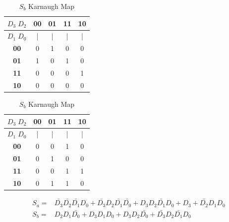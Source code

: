 \documentclass{article}
\begin{document}
\begin{table}[H]
  \centering
  \begin{minipage}{0.45\textwidth}
  \centering
  \begin{tabular}{|c|c|c|c|c|}
  \hline
  \textbf{$D_3 \; D_2$} & \textbf{00} & \textbf{01} & \textbf{11} & \textbf{10} \\
  \hline
  \textbf{$D_1 \; D_0$} & | & | & | & | \\
  \hline
  \textbf{00} & 0 & 1 & 0 & 0 \\
  \hline
  \textbf{01} & 1 & 0 & 1 & 0 \\
  \hline
  \textbf{11} & 0 & 0 & 0 & 1 \\
  \hline
  \textbf{10} & 0 & 0 & 0 & 0 \\
  \hline
  \end{tabular}
  \caption{$S_a$ Karnaugh Map}
  \end{minipage}
  \hfill
  \begin{minipage}{0.45\textwidth}
  \centering
  \begin{tabular}{|c|c|c|c|c|}
  \hline
  \textbf{$D_3 \; D_2$} & \textbf{00} & \textbf{01} & \textbf{11} & \textbf{10} \\
  \hline
  \textbf{$D_1 \; D_0$} & | & | & | & | \\
  \hline
  \textbf{00} & 0 & 0 & 1 & 0 \\
  \hline
  \textbf{01} & 0 & 1 & 0 & 0 \\
  \hline
  \textbf{11} & 0 & 0 & 1 & 1 \\
  \hline
  \textbf{10} & 0 & 1 & 1 & 0 \\
  \hline
  \end{tabular}
  \caption{$S_b$ Karnaugh Map}
  \end{minipage}
\end{table}
\begin{align*}
  S_a =& \bar{D_3}\bar{D_2}\bar{D_1}D_0+\bar{D_3}D_2\bar{D_1}\bar{D_0}+D_3D_2\bar{D_1}D_0+D_3+\bar{D_2}D_1D_0\\
  S_b =&D_2D_1\bar{D_0}+D_3D_1D_0+D_3D_2\bar{D_0}+\bar{D_3}D_2\bar{D_1}D_0
\end{align*}
\end{document}
